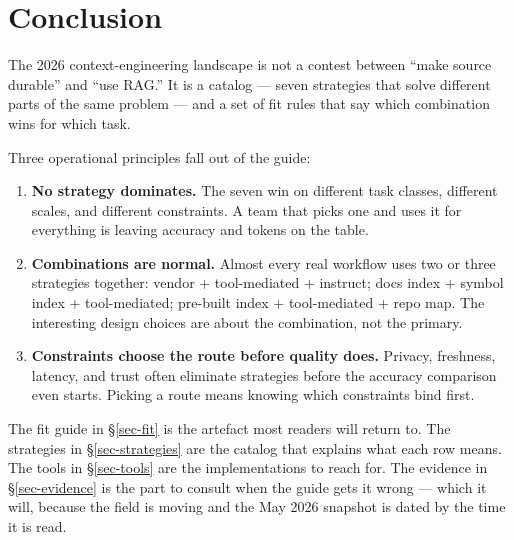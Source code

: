 \documentclass[
  11pt,
  letterpaper,
  numbers=noendperiod,
  parskip=half]{scrartcl}
\providecommand{\tightlist}{%
  \setlength{\itemsep}{0pt}\setlength{\parskip}{0pt}}
\begin{document}
\fi

\section{Conclusion}\label{sec-conclusion}

The 2026 context-engineering landscape is not a contest between
``make source durable'' and ``use RAG.'' It is a catalog --- seven strategies
that solve different parts of the same problem --- and a set of fit
rules that say which combination wins for which task.

Three operational principles fall out of the guide:

\begin{enumerate}
\def\labelenumi{\arabic{enumi}.}
\tightlist
\item
  \textbf{No strategy dominates.} The seven win on different task
  classes, different scales, and different constraints. A team that
  picks one and uses it for everything is leaving accuracy and tokens
  on the table.
\item
  \textbf{Combinations are normal.} Almost every real workflow uses
  two or three strategies together: vendor + tool-mediated + instruct;
  docs index + symbol index + tool-mediated; pre-built index +
  tool-mediated + repo map. The interesting design choices are about
  the combination, not the primary.
\item
  \textbf{Constraints choose the route before quality does.} Privacy,
  freshness, latency, and trust often eliminate strategies before the
  accuracy comparison even starts. Picking a route means knowing
  which constraints bind first.
\end{enumerate}

The fit guide in \S\ref{sec-fit} is the artefact most readers will
return to. The strategies in \S\ref{sec-strategies} are the catalog
that explains what each row means. The tools in \S\ref{sec-tools} are
the implementations to reach for. The evidence in \S\ref{sec-evidence}
is the part to consult when the guide gets it wrong --- which it will,
because the field is moving and the May 2026 snapshot is dated by the
time it is read.
\end{document}
